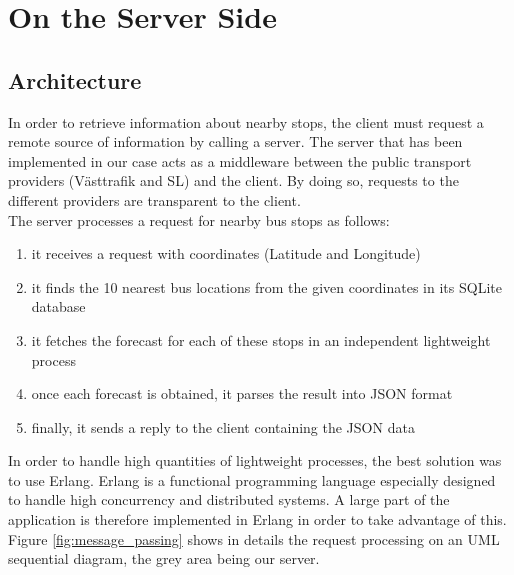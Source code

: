 \chapter{On the Server Side}
\label{cha:on_the_server_side}

\section{Architecture}

In order to retrieve information about nearby stops, the client must request a remote source of information by calling a server. The server that has been implemented in our case acts as a middleware between the public transport providers (Västtrafik and SL) and the client. By doing so, requests to the different providers are transparent to the client.\\

The server processes a request for nearby bus stops as follows:

\begin{enumerate}
\item{it receives a request with coordinates (Latitude and Longitude)}
\item{it finds the 10 nearest bus locations from the given coordinates in its SQLite database}
\item{it fetches the forecast for each of these stops in an independent lightweight process}
\item{once each forecast is obtained, it parses the result into JSON format}
\item{finally, it sends a reply to the client containing the JSON data}
\end{enumerate}

In order to handle high quantities of lightweight processes, the best solution was to use Erlang. Erlang is a functional programming language especially designed to handle high concurrency and distributed systems.  A large part of the application is therefore implemented in Erlang in order to take advantage of this.\\

Figure \ref{fig:message_passing} shows in details the request processing on an UML sequential diagram, the grey area being our server.


